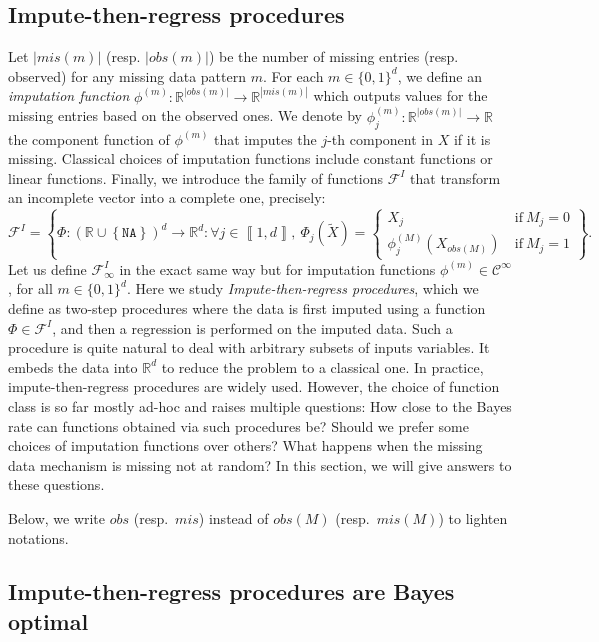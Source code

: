 \documentclass{article}
\newcommand{\RR}{\mathbb{R}}
\newcommand{\Ccal}{\mathcal{C}}
\newcommand{\Fcal}{\mathcal{F}}
\newcommand{\NA}{\mathtt{NA}}
\newcommand{\br}[1]{\left(#1\right)}
\newcommand{\cbr}[1]{\left\{#1\right\}}
\newcommand{\bbr}[1]{\left\llbracket#1\right\rrbracket}
\theoremstyle{plain}
\begin{document}
\subsection{Impute-then-regress procedures}
Let $|mis(m)|$ (resp. $|obs(m)|$) be the number of missing entries (resp. observed) for any missing data pattern $m$. For each $m \in \{0,1\}^d$, we define an \emph{imputation function} $\phi^{(m)}: \RR^{|obs(m)|} \to \RR^{|mis(m)|}$ which outputs values for the missing entries based on the observed ones. We denote by $\phi_j^{(m)}: \RR^{|obs(m)|} \to \RR$ the component function of $\phi^{(m)}$ that imputes the $j$-th component in $X$ if it is missing. Classical choices of imputation functions include constant functions or linear functions. Finally, we introduce the family of functions $\Fcal^I$ that transform an incomplete vector into a complete one, precisely:
\begin{equation}
    \label{eq:imputation}
    \Fcal^I = \cbr{\Phi: \br{\RR \cup \cbr{\NA}}^d \to \RR^d: \forall j \in \bbr{1, d},\: \Phi_j(\widetilde X) =
    \begin{cases}
        X_j \: &\text{if} \: M_j = 0\\
        \phi^{(M)}_j(X_{obs(M)}) \: &\text{if} \: M_j = 1
    \end{cases}
    }.
\end{equation}
Let us define $\Fcal^I_{\infty}$ in the exact same way but for imputation functions $\phi^{(m)} \in \Ccal^{\infty}$, for all $m \in \{0,1\}^d$. Here we study \emph{Impute-then-regress procedures}, which we define as two-step procedures where the data is first imputed using a function $\Phi \in \Fcal^I$, and then a regression is performed on the imputed data. Such a procedure is quite natural to deal with arbitrary subsets of inputs variables. It embeds the data into $\RR^d$ to reduce the problem to a classical one. In practice, impute-then-regress procedures are widely used. However, the choice of function class is so far mostly ad-hoc and raises multiple questions: How close to the Bayes rate can functions obtained via such procedures be? Should we prefer some choices of imputation functions over others? What happens when the missing data mechanism is missing not at random? In this section, we will give answers to these questions.

Below, we write $obs$ (resp.~$mis$) instead of $obs(M)$ (resp.~$mis(M)$) to lighten notations.

\subsection{Impute-then-regress procedures are Bayes optimal}
\end{document}
